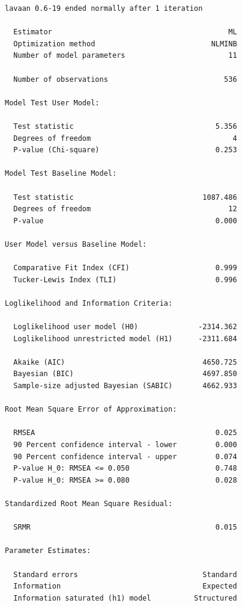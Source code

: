 \documentclass[
  letterpaper,
  DIV=11,
  numbers=noendperiod]{scrartcl}
\begin{document}
\begin{verbatim}
lavaan 0.6-19 ended normally after 1 iteration

  Estimator                                         ML
  Optimization method                           NLMINB
  Number of model parameters                        11

  Number of observations                           536

Model Test User Model:
                                                      
  Test statistic                                 5.356
  Degrees of freedom                                 4
  P-value (Chi-square)                           0.253

Model Test Baseline Model:

  Test statistic                              1087.486
  Degrees of freedom                                12
  P-value                                        0.000

User Model versus Baseline Model:

  Comparative Fit Index (CFI)                    0.999
  Tucker-Lewis Index (TLI)                       0.996

Loglikelihood and Information Criteria:

  Loglikelihood user model (H0)              -2314.362
  Loglikelihood unrestricted model (H1)      -2311.684
                                                      
  Akaike (AIC)                                4650.725
  Bayesian (BIC)                              4697.850
  Sample-size adjusted Bayesian (SABIC)       4662.933

Root Mean Square Error of Approximation:

  RMSEA                                          0.025
  90 Percent confidence interval - lower         0.000
  90 Percent confidence interval - upper         0.074
  P-value H_0: RMSEA <= 0.050                    0.748
  P-value H_0: RMSEA >= 0.080                    0.028

Standardized Root Mean Square Residual:

  SRMR                                           0.015

Parameter Estimates:

  Standard errors                             Standard
  Information                                 Expected
  Information saturated (h1) model          Structured


\end{verbatim}
\end{document}
